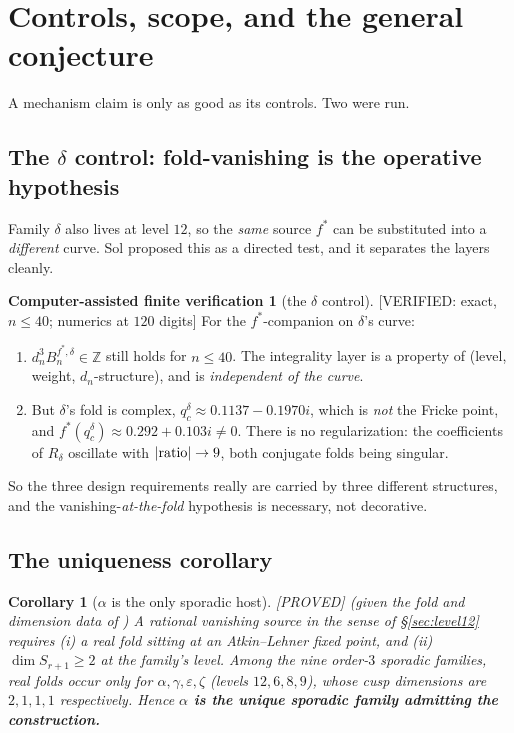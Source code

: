 \documentclass[11pt,reqno]{amsart}
\theoremstyle{plain}
\newtheorem{corollary}[theorem]{Corollary}
\theoremstyle{definition}
\newtheorem{verification}[theorem]{Computer-assisted finite verification}
\theoremstyle{remark}
\newcommand{\Z}{\mathbb{Z}}
\newcommand{\fs}{f^{*}}
\newcommand{\Proved}{\textup{\textsf{[PROVED]}}}
\newcommand{\VerifiedR}[1]{\textup{\textsf{[VERIFIED: #1]}}}
\begin{document}
\section{Controls, scope, and the general conjecture}\label{sec:scope}

A mechanism claim is only as good as its controls. Two were run.

\subsection{The $\delta$ control: fold-vanishing is the operative hypothesis}
\label{sec:delta}
Family $\delta$ also lives at level $12$, so the \emph{same} source $\fs$
can be substituted into a \emph{different} curve. Sol proposed this as a
directed test, and it separates the layers cleanly.

\begin{verification}[the $\delta$ control]\label{ver:delta}
\VerifiedR{exact, $n\le40$; numerics at $120$ digits}
For the $\fs$-companion on $\delta$'s curve:
\begin{enumerate}[leftmargin=2em]
\item $d_n^3B^{\fs,\delta}_n\in\Z$ still holds for $n\le40$. The
integrality layer is a property of (level, weight, $d_n$-structure), and is
\emph{independent of the curve}.
\item But $\delta$'s fold is complex, $q_c^\delta\approx0.1137-0.1970i$,
which is \emph{not} the Fricke point, and
$\fs(q_c^\delta)\approx0.292+0.103i\ne0$. There is no regularization:
the coefficients of $R_\delta$ oscillate with $|{\rm ratio}|\to9$, both
conjugate folds being singular.
\end{enumerate}
\end{verification}

So the three design requirements really are carried by three different
structures, and the vanishing-\emph{at-the-fold} hypothesis is necessary,
not decorative.

\subsection{The uniqueness corollary}
\begin{corollary}[$\alpha$ is the only sporadic host]\label{cor:unique}
\Proved{} \emph{(given the fold and dimension data of
\cite{philedger,anchors})}
A rational vanishing source in the sense of \S\ref{sec:level12} requires
(i) a \emph{real} fold sitting at an Atkin--Lehner fixed point, and
(ii) $\dim S_{r+1}\ge2$ at the family's level. Among the nine order-$3$
sporadic families, real folds occur only for $\alpha,\gamma,\varepsilon,
\zeta$ (levels $12,6,8,9$), whose cusp dimensions are $2,1,1,1$
respectively. Hence \textbf{$\alpha$ is the unique sporadic family
admitting the construction.}
\end{corollary}
\end{document}

